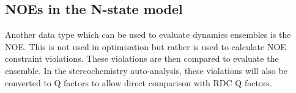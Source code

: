 \subsection{NOEs in the N-state model}

Another data type which can be used to evaluate dynamics ensembles is the NOE.
This is not used in optimisation but rather is used to calculate NOE constraint violations.
These violations are then compared to evaluate the ensemble.
In the stereochemistry auto-analysis, these violations will also be converted to Q factors to allow direct comparison with RDC Q factors.
